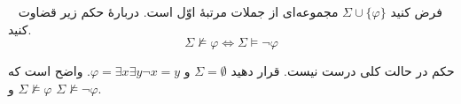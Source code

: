 ~
فرض کنید $\Sigma \cup \{\varphi\}$ مجموعه‌ای از جملات مرتبهٔ اوّل است. دربارهٔ حکم زیر قضاوت کنید.
\[ \Sigma \not \vDash \varphi \iff \Sigma \vDash \neg \varphi \]
\begin{ans}
    حکم در حالت کلی درست نیست. قرار دهید
    $\Sigma=\emptyset$
    و
    $\varphi=\exists x\exists y \neg x = y$.
    واضح است که
    $\Sigma\not\vDash\varphi$
    و
    $\Sigma\not\vDash\neg\varphi$.
\end{ans}